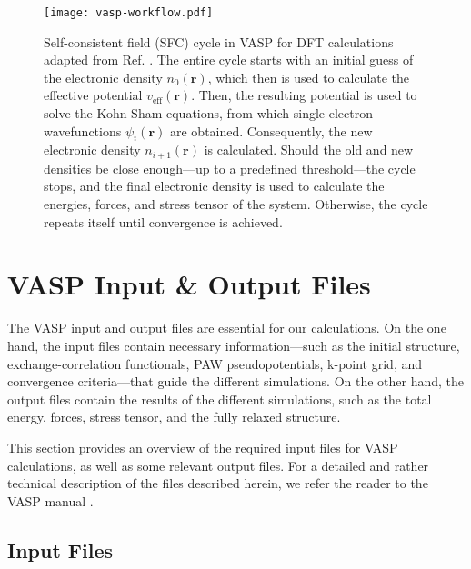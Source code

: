 \begin{figure}[h]
    \centering
    \texttt{[image: vasp-workflow.pdf]}
    \caption{
        Self-consistent field (SFC) cycle in VASP for DFT calculations adapted from Ref. \cite{sholl2023density}. The entire cycle starts with an initial guess of the electronic density $n_0(\mathbf{r})$, which then is used to calculate the effective potential $v_{\text{eff}}(\mathbf{r})$. Then, the resulting potential is used to solve the Kohn-Sham equations, from which single-electron wavefunctions $\psi_i(\mathbf{r})$ are obtained. Consequently, the new electronic density $n_{i+1}(\mathbf{r})$ is calculated. Should the old and new densities be close enough---up to a predefined threshold---the cycle stops, and the final electronic density is used to calculate the energies, forces, and stress tensor of the system. Otherwise, the cycle repeats itself until convergence is achieved. 
    }
    \label{fig:vasp_workflow}
\end{figure}

\section{VASP Input \& Output Files}
\label{sec:vasp-input-output-files}
The VASP input and output files are essential for our calculations. On the one hand, the input files contain necessary information---such as the initial structure, exchange-correlation functionals, PAW pseudopotentials, k-point grid, and convergence criteria---that guide the different simulations. On the other hand, the output files contain the results of the different simulations, such as the total energy, forces, stress tensor, and the fully relaxed structure.

This section provides an overview of the required input files for VASP calculations, as well as some relevant output files. For a detailed and rather technical description of the files described herein, we refer the reader to the VASP manual \cite{zotero-item-672}.

\subsection{Input Files}
